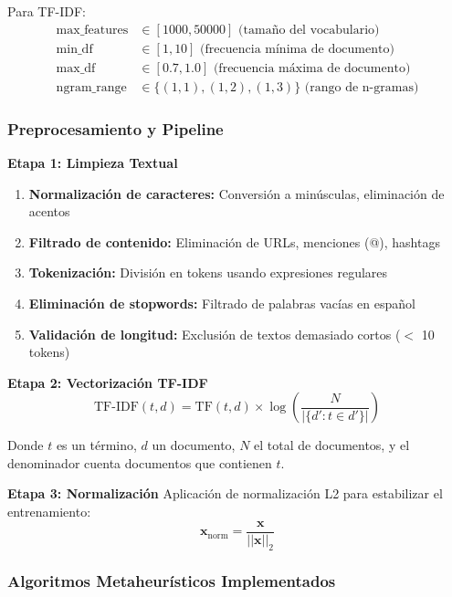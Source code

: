 Para TF-IDF:
\begin{align}
\text{max\_features} &\in [1000, 50000] \text{ (tamaño del vocabulario)} \\
\text{min\_df} &\in [1, 10] \text{ (frecuencia mínima de documento)} \\
\text{max\_df} &\in [0.7, 1.0] \text{ (frecuencia máxima de documento)} \\
\text{ngram\_range} &\in \{(1,1), (1,2), (1,3)\} \text{ (rango de n-gramas)}
\end{align}

\subsubsection{Preprocesamiento y Pipeline}

\textbf{Etapa 1: Limpieza Textual}
\begin{enumerate}
    \item \textbf{Normalización de caracteres:} Conversión a minúsculas, eliminación de acentos
    \item \textbf{Filtrado de contenido:} Eliminación de URLs, menciones (@), hashtags
    \item \textbf{Tokenización:} División en tokens usando expresiones regulares
    \item \textbf{Eliminación de stopwords:} Filtrado de palabras vacías en español
    \item \textbf{Validación de longitud:} Exclusión de textos demasiado cortos ($<$ 10 tokens)
\end{enumerate}

\textbf{Etapa 2: Vectorización TF-IDF}
\begin{equation}
\text{TF-IDF}(t,d) = \text{TF}(t,d) \times \log\left(\frac{N}{|\{d' : t \in d'\}|}\right)
\end{equation}

Donde $t$ es un término, $d$ un documento, $N$ el total de documentos, y el denominador cuenta documentos que contienen $t$.

\textbf{Etapa 3: Normalización}
Aplicación de normalización L2 para estabilizar el entrenamiento:
\begin{equation}
\mathbf{x}_{\text{norm}} = \frac{\mathbf{x}}{||\mathbf{x}||_2}
\end{equation}

\subsubsection{Algoritmos Metaheurísticos Implementados}

